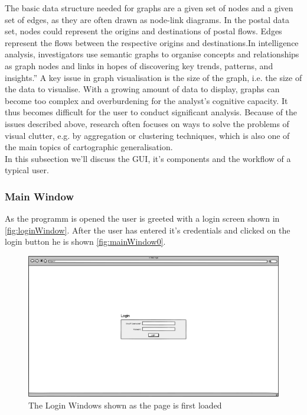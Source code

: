\documentclass[twoside, english, draft]{Pflichtenheft}
\begin{document}
The basic data structure needed for graphs are a given set of nodes and a given set of edges, as they are often drawn
as node-link diagrams. In the postal data set, nodes could represent the origins and destinations of postal flows. Edges represent the flows between the respective origins and destinations.In intelligence analysis, investigators use semantic graphs to organise concepts and relationships as graph nodes and links in hopes of discovering key trends, patterns, and insights.” A key issue in graph visualisation is the size of the graph, i.e. the size of the data to visualise. With a growing amount of data to display, graphs can become too complex and overburdening for the analyst’s cognitive capacity. It thus becomes difficult for the user to conduct significant analysis. Because of the issues described above, research often focuses on ways to solve the problems of visual clutter, e.g. by aggregation or clustering techniques, which is also one of the main topics of cartographic generalisation.
\\
In this subsection we'll discuss the GUI, it's components and the workflow of a typical user.

\subsubsection{Main Window}
As the programm is opened the user is greeted with a login screen shown in \autoref{fig:loginWindow}. After the user has entered it's credentials and clicked on the login button he is shown \autoref{fig:mainWindow0}.
\\
\vfill

\begin{figure}[h]
	\centering
	\includegraphics[width=\textwidth]{Images/01MWL.png}
	\caption{The Login Windows shown as the page is first loaded}
	\label{fig:loginWindow}
\end{figure}
\end{document}
